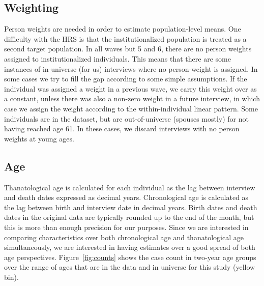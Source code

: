 \documentclass{article}
\begin{document}
\subsection{Weighting}
Person weights
are needed in order to estimate population-level means.
One difficulty with the HRS is that the institutionalized population is treated
as a second target population. In all waves but 5 and 6, there are no person weights
assigned to institutionalized individuals. This means that there are some
instances of in-universe (for us) interviews where no person-weight is
assigned. In some cases we try to fill the gap according to some simple
assumptions. If the individual was assigned a weight in a previous wave, we
carry this weight over as a constant, unless there was also a non-zero weight in a future interview, in
which case we assign the weight according to the within-individual linear
pattern. Some individuals are in the dataset, but are
out-of-universe (spouses mostly) for not having reached age 61. In these
cases, we discard interviews with no person weights at young ages. 

\subsection{Age}
Thanatological age is calculated for each individual as the lag between
interview and death dates expressed as decimal years. Chronological age is
calculated as the lag between birth and interview date in decimal years. Birth
dates and death dates in the original data are typically rounded up to the end
of the month, but this is more than enough precision for our purposes. Since we
are interested in comparing characteristics over both chronological age and
thanatological age simultaneously, we are interested in having estimates over a
good spread of both age perspectives.
Figure~\ref{fig:counts} shows the case count in two-year age groups over the range of ages that are in the data and in universe for this
study (yellow bin). 
\end{document}
